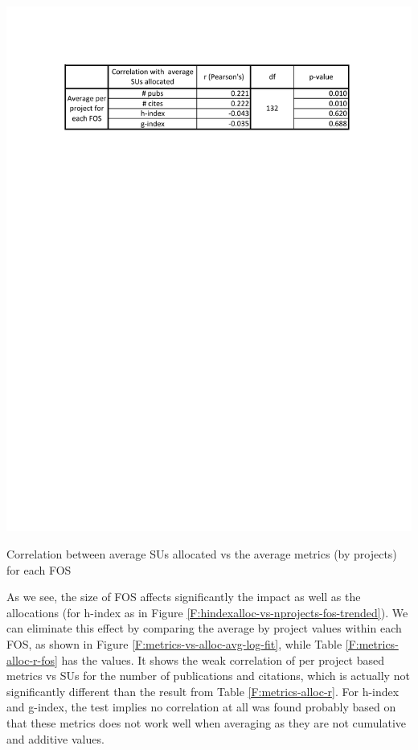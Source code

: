 \documentclass{sig-alternate}
\begin{document}
\begin{table}[htb] 
  \centering 
    \includegraphics[width=1.0\columnwidth]{images/metrics_alloc_r_fos.pdf} 
  \caption{Correlation between average SUs allocated vs the average metrics (by projects) for each FOS}\label{F:metrics-alloc-r-fos} 
\end{table} 
 
As we see, the size of FOS affects significantly the impact as well as the allocations (for h-index as in Figure \ref{F:hindexalloc-vs-nprojects-fos-trended}). We can eliminate this effect by comparing the average by project values within each FOS, as shown in Figure \ref{F:metrics-vs-alloc-avg-log-fit}, while Table \ref{F:metrics-alloc-r-fos} has the values. It shows the weak correlation of per project based metrics vs SUs for the number of publications and citations, which is actually not significantly different than the result from Table \ref{F:metrics-alloc-r}. For h-index and g-index, the test implies no correlation at all was found probably based on that these metrics does not work well when averaging as they are not cumulative and additive values. 
 
\end{document}
